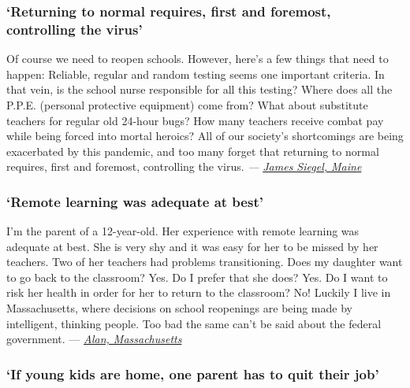 \hypertarget{returning-to-normal-requires-first-and-foremost-controlling-the-virus}{%
\subsubsection{\texorpdfstring{\textbf{`Returning to normal requires,
first and foremost, controlling the
virus'}}{`Returning to normal requires, first and foremost, controlling the virus'}}\label{returning-to-normal-requires-first-and-foremost-controlling-the-virus}}

Of course we need to reopen schools. However, here's a few things that
need to happen: Reliable, regular and random testing seems one important
criteria. In that vein, is the school nurse responsible for all this
testing? Where does all the P.P.E. (personal protective equipment) come
from? What about substitute teachers for regular old 24-hour bugs? How
many teachers receive combat pay while being forced into mortal heroics?
All of our society's shortcomings are being exacerbated by this
pandemic, and too many forget that returning to normal requires, first
and foremost, controlling the virus. \emph{---}
\href{https://nyti.ms/38ZtS8M\#permid=108139377}{\emph{James Siegel,
Maine}}

\hypertarget{remote-learning-was-adequate-at-best}{%
\subsubsection{\texorpdfstring{\textbf{`Remote learning was adequate at
best'}}{`Remote learning was adequate at best'}}\label{remote-learning-was-adequate-at-best}}

I'm the parent of a 12-year-old. Her experience with remote learning was
adequate at best. She is very shy and it was easy for her to be missed
by her teachers. Two of her teachers had problems transitioning. Does my
daughter want to go back to the classroom? Yes. Do I prefer that she
does? Yes. Do I want to risk her health in order for her to return to
the classroom? No! Luckily I live in Massachusetts, where decisions on
school reopenings are being made by intelligent, thinking people. Too
bad the same can't be said about the federal government. ---
\href{https://nyti.ms/32n4WXM\#permid=108138527}{\emph{Alan,
Massachusetts}}

\hypertarget{if-young-kids-are-home-one-parent-has-to-quit-their-job}{%
\subsubsection{\texorpdfstring{\textbf{`If young kids are home, one
parent has to quit their
job'}}{`If young kids are home, one parent has to quit their job'}}\label{if-young-kids-are-home-one-parent-has-to-quit-their-job}}

